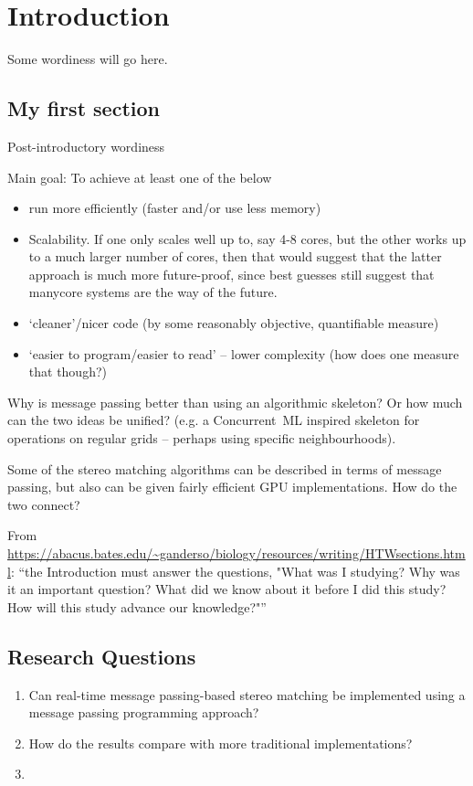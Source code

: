 \chapter{Introduction}
Some wordiness will go here.

\section{My first section}
Post-introductory wordiness

Main goal:  To achieve at least one of the below
\begin{itemize}
\item run more efficiently (faster and/or use less memory)
\item Scalability.  If one only scales well up to, say 4-8 cores, but the other works up to a much larger number of cores, then that would suggest that the latter approach is much more future-proof, since best guesses still suggest that manycore systems are the way of the future.
\item `cleaner'/nicer code (by some reasonably objective, quantifiable measure)
\item `easier to program/easier to read' -- lower complexity (how does one measure that though?)
\end{itemize}

Why is message passing better than using an algorithmic skeleton?  Or how much can the two ideas be unified?  (e.g. a Concurrent~ML inspired skeleton for operations on regular grids -- perhaps using specific neighbourhoods).

Some of the stereo matching algorithms can be described in terms of message passing, but also can be given fairly efficient GPU implementations.  How do the two connect?

From \url{https://abacus.bates.edu/~ganderso/biology/resources/writing/HTWsections.html}:  ``the Introduction must answer the questions, "What was I studying? Why was it an important question? What did we know about it before I did this study? How will this study advance our knowledge?"''

\section{Research Questions}
\begin{enumerate}
    \item Can real-time message passing-based stereo matching be implemented using a message passing programming approach?
    \item How do the results compare with more traditional implementations?
    \item 
\end{enumerate}

